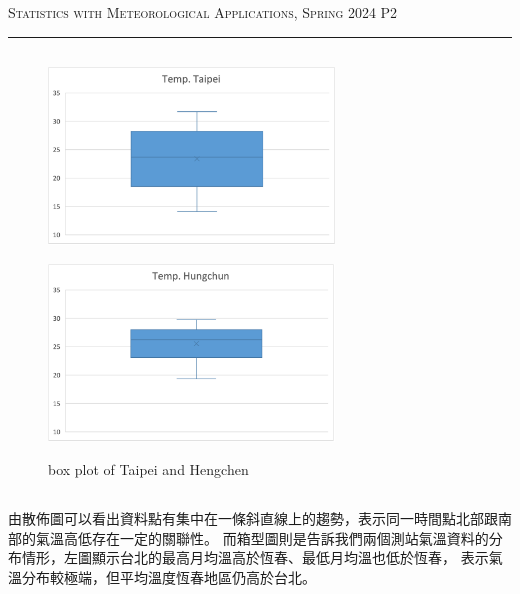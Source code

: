 \documentclass{article}
\begin{document}
\begin{CJK*}{UTF8}{bsmi}
\newpage
\thispagestyle{empty}
\hfill {\scshape \large Statistics with Meteorological Applications, Spring 2024} \hfill {\scshape P2}
\smallskip
\hrule
\bigskip
\bigskip
\bigskip

    \subsection*{}
        \begin{figure}[h]
            \begin{minipage}{0.5\textwidth}
                \includegraphics[width=7.6cm]{Picture2.png} 
                \label{fig:subim1}
            \end{minipage}
                \begin{minipage}{0.5\textwidth}
                \includegraphics[width=7.6cm]{Picture3.png}
                \label{fig:subim2}
            \end{minipage}
            \caption{box plot of Taipei and Hengchen}
        \end{figure}
    
        \subsection*{}
        \begin{spacing}{2.5}
            \begin{large}
                由散佈圖可以看出資料點有集中在一條斜直線上的趨勢，表示同一時間點北部跟南部的氣溫高低存在一定的關聯性。
                而箱型圖則是告訴我們兩個測站氣溫資料的分布情形，左圖顯示台北的最高月均溫高於恆春、最低月均溫也低於恆春，
                表示氣溫分布較極端，但平均溫度恆春地區仍高於台北。
            \end{large}
        \end{spacing}



\end{CJK*}
\end{document}
